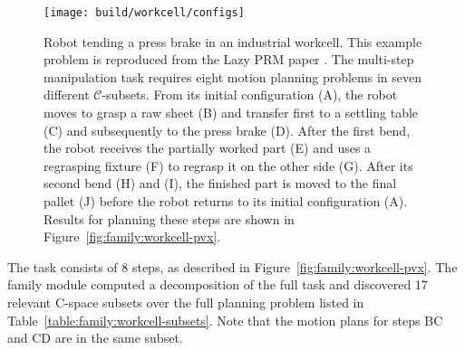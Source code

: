 \begin{figure}
   \centering
   \texttt{[image: build/workcell/configs]}
   \caption{Robot tending a press brake in an industrial workcell.
      This example problem is reproduced from the Lazy PRM paper
      \citep{bohlin2000lazyprm}.
      The multi-step manipulation task requires eight motion planning
      problems in seven different $\mathcal{C}$-subsets.
      From its initial configuration (A),
      the robot moves to grasp a raw sheet (B)
      and transfer first to a settling table (C)
      and subsequently to the press brake (D).
      After the first bend, the robot receives the partially worked
      part (E) and uses a regrasping fixture (F)
      to regrasp it on the other side (G).
      After its second bend (H) and (I),
      the finished part is moved to the final pallet (J)
      before the robot returns to its initial configuration (A).
      Results for planning these steps are shown in
      Figure~\ref{fig:family:workcell-pvx}.}
   \label{fig:family:workcell-configs}
\end{figure}

The task consists of 8 steps,
as described in Figure~\ref{fig:family:workcell-pvx}.
The family module computed a decomposition of the full task
and discovered 17 relevant C-space subsets
over the full planning problem
listed in Table~\ref{table:family:workcell-subsets}.
Note that the motion plans for steps BC and CD are in the same
subset.

